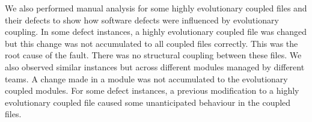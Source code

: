 \documentclass[times]{smrauth}
\begin{document}







We also performed manual analysis for some highly evolutionary coupled files and their defects to show how software defects were influenced by evolutionary coupling. In some defect instances, a highly evolutionary coupled file was changed but this change was not accumulated to all coupled files correctly. This was the root cause of the fault. There was no structural coupling between these files. We also observed similar instances but across different modules managed by different teams. A change made in a module was not accumulated to the evolutionary coupled modules. For some defect instances, a previous modification to a highly evolutionary coupled file caused some unanticipated behaviour in the coupled files. 
\end{document}
